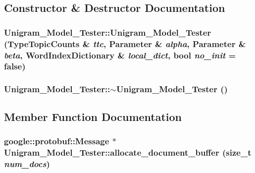 \subsection{Constructor \& Destructor Documentation}
\hypertarget{class_unigram___model___tester_af48089157061db407a1818403884a0a9}{
\subsubsection[{Unigram\_\-Model\_\-Tester}]{\setlength{\rightskip}{0pt plus 5cm}Unigram\_\-Model\_\-Tester::Unigram\_\-Model\_\-Tester ({\bf TypeTopicCounts} \& {\em ttc}, \/  {\bf Parameter} \& {\em alpha}, \/  {\bf Parameter} \& {\em beta}, \/  {\bf WordIndexDictionary} \& {\em local\_\-dict}, \/  bool {\em no\_\-init} = {\ttfamily false})}}
\label{class_unigram___model___tester_af48089157061db407a1818403884a0a9}
\hypertarget{class_unigram___model___tester_adb5becca4680bbc5caf22ac50f1f6d11}{
\subsubsection[{$\sim$Unigram\_\-Model\_\-Tester}]{\setlength{\rightskip}{0pt plus 5cm}Unigram\_\-Model\_\-Tester::$\sim$Unigram\_\-Model\_\-Tester ()}}
\label{class_unigram___model___tester_adb5becca4680bbc5caf22ac50f1f6d11}


\subsection{Member Function Documentation}
\hypertarget{class_unigram___model___tester_a81877bb24ead9124407d32109a83acba}{
\subsubsection[{allocate\_\-document\_\-buffer}]{\setlength{\rightskip}{0pt plus 5cm}google::protobuf::Message $\ast$ Unigram\_\-Model\_\-Tester::allocate\_\-document\_\-buffer (size\_\-t {\em num\_\-docs})}}
\label{class_unigram___model___tester_a81877bb24ead9124407d32109a83acba}


